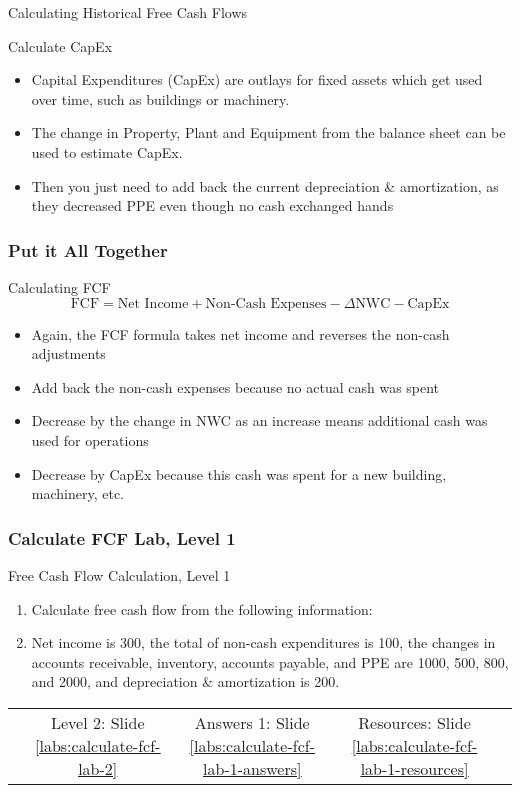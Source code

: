 \documentclass[handout, 11pt]{beamer}
\begin{document}
\begin{section}{Calculating Historical Free Cash Flows}
\begin{frame}
\begin{block}{Calculate CapEx}
\end{block}
\vfill
\begin{itemize}
\item Capital Expenditures (CapEx) are outlays for fixed assets which get used over time, such as buildings or machinery.
\vfill
\item The change in Property, Plant and Equipment from the balance sheet can be used to estimate CapEx.
\vfill
\item Then you just need to add back the current depreciation \& amortization, as they decreased PPE even though no cash exchanged hands
\end{itemize}
\end{frame}
\begin{frame}
\frametitle{Put it All Together}
\begin{block}{Calculating FCF}
\begin{equation}
	\text{FCF} = \text{Net Income} + \text{Non-Cash Expenses} - \Delta\text{NWC} - \text{CapEx}
\end{equation}
\end{block}
\vfill
\begin{itemize}
\item Again, the FCF formula takes net income and reverses the non-cash adjustments
\vfill
\item Add back the non-cash expenses because no actual cash was spent
\vfill
\item Decrease by the change in NWC as an increase means additional cash was used for operations
\vfill
\item Decrease by CapEx because this cash was spent for a new building, machinery, etc.
\end{itemize}
\end{frame}
\begin{frame}
\frametitle{Calculate FCF Lab, Level 1}
{
\begin{block}{Free Cash Flow Calculation, Level 1}
\begin{enumerate}
\item Calculate free cash flow from the following information:
\item Net income is 300, the total of non-cash expenditures is 100, the changes in accounts receivable, inventory, accounts payable, and PPE are 1000, 500, 800, and 2000, and depreciation \& amortization is 200.
\end{enumerate}
\vfill
\begin{tabular*}{\textwidth}{@{\extracolsep{\fill}}ccccc}
\toprule
\hfill & Level 2: Slide \textcolor{blue}{\underline{\ref{labs:calculate-fcf-lab-2}}} & Answers 1: Slide \textcolor{blue}{\underline{\ref{labs:calculate-fcf-lab-1-answers}}} & Resources: Slide \textcolor{blue}{\underline{\ref{labs:calculate-fcf-lab-1-resources}}} & \hfill\\


\end{tabular*}
\end{block}}
\end{frame}
\end{section}
\end{document}
